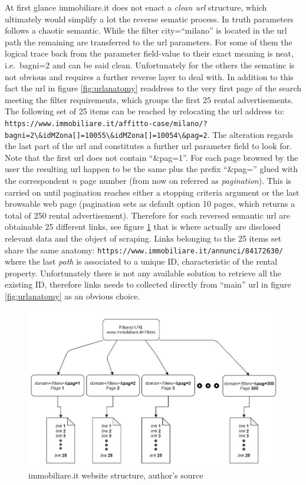 \documentclass[
  12pt,
  a4paper,
  oneside]{book}
\newcommand{\passthrough}[1]{#1}
\theoremstyle{definition}
\theoremstyle{definition}
\theoremstyle{definition}
\theoremstyle{remark}
\begin{document}
At first glance immobiliare.it does not enact a \emph{clean url} \citep{wiki:cleanurl} structure, which ultimately would simplify a lot the reverse sematic process.
In truth parameters follows a chaotic semantic. While the filter city=``milano'' is located in the url path the remaining are transferred to the url parameters. For some of them the logical trace back from the parameter field-value to their exact meaning is neat, i.e.~bagni=2 and can be said clean. Unfortunately for the others the sematinc is not obvious and requires a further reverse layer to deal with.
In addition to this fact the url in figure \ref{fig:urlanatomy} readdress to the very first page of the search meeting the filter requirements, which groups the first 25 rental advertisements. The following set of 25 items can be reached by relocating the url address to:
\passthrough{\lstinline!https://www.immobiliare.it/affitto-case/milano/?bagni=2\&idMZona[]=10055\&idMZona[]=10054\&pag=2!}. The alteration regards the last part of the url and constitutes a further url parameter field to look for. Note that the first url does not contain ``\&pag=1''. For each page browsed by the user the resulting url happen to be the same plus the prefix ``\&pag='' glued with the correspondent \(n\) page number (from now on referred as \emph{pagination}). This is carried on until pagination reaches either a stopping criteria argument or the last browsable web page (pagination sets as default option 10 pages, which returns a total of 250 rental advertisement).
Therefore for each reversed semantic url are obtainable 25 different links, see figure \ref{fig:nestedstructure} that is where actually are disclosed relevant data and the object of scraping. Links belonging to the 25 items set share the same anatomy: \passthrough{\lstinline!https://www.immobiliare.it/annunci/84172630/!} where the last \emph{path} is associated to a unique
ID, characteristic of the rental property. Unfortunately there is not any available solution to retrieve all the existing ID, therefore links needs to collected directly from ``main'' url in figure \ref{fig:urlanatomy} as an obvious choice.

\begin{figure}
\centering
\includegraphics{images/website_tree1.jpg}
\caption{\label{fig:nestedstructure}immobiliare.it website structure, author's source}
\end{figure}
\end{document}
